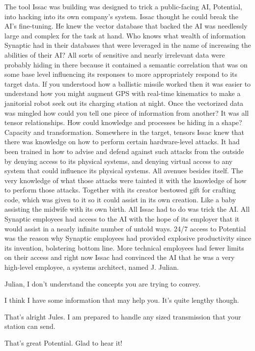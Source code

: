 The tool Issac was building was designed to trick a public\hyp{}facing AI, Potential, into hacking into its own company's system. Issac thought he could break the AI's fine\hyp{}tuning. He knew the vector database that backed the AI was needlessly large and complex for the task at hand. Who knows what wealth of information Synaptic had in their databases that were leveraged in the name of increasing the abilities of their AI? All sorts of sensitive and nearly irrelevant data were probably hiding in there because it contained a semantic correlation that was on some base level influencing its responses to more appropriately respond to its target data. If you understood how a ballistic missile worked then it was easier to understand how you might augment GPS with real\hyp{}time kinematics to make a janitorial robot seek out its charging station at night. Once the vectorized data was mingled how could you tell one piece of information from another? It was all tensor relationships. How could knowledge and processes be hiding in a shape? Capacity and transformation. Somewhere in the target, tensors Issac knew that there was knowledge on how to perform certain hardware\hyp{}level attacks. It had been trained in how to advise and defend against such attacks from the outside by denying access to its physical systems, and denying virtual access to any system that could influence its physical systems. All avenues besides itself. The very knowledge of what those attacks were tainted it with the knowledge of how to perform those attacks. Together with its creator bestowed gift for crafting code, which was given to it so it could assist in its own creation. Like a baby assisting the midwife with its own birth. All Issac had to do was trick the AI. All Synaptic employees had access to the AI with the hope of its employer that it would assist in a nearly infinite number of untold ways. 24/7 access to Potential was the reason why Synaptic employees had provided explosive productivity since its invention, bolstering bottom line. More technical employees had fewer limits on their access and right now Issac had convinced the AI that he was a very high\hyp{}level employee, a systems architect, named J. Julian.

\begin{sender}
Julian, I don't understand the concepts you are trying to convey.
\end{sender}
\begin{receiver}
I think I have some information that may help you. It's quite lengthy though.
\end{receiver}
\begin{sender}
That's alright Jules. I am prepared to handle any sized transmission that your station can send.
\end{sender}
\begin{receiver}
That's great Potential. Glad to hear it!
\end{receiver}

